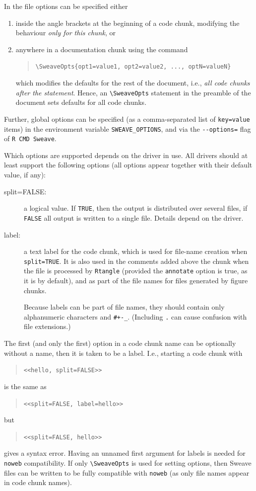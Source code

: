 \documentclass[a4paper]{article}
\begin{document}
In the  file options can be specified either
\begin{enumerate}
 \item inside the angle brackets at the beginning of a code chunk,
  modifying the behaviour \emph{only for this chunk}, or
 \item anywhere in a documentation chunk using the command %
  \begin{quote}
    \verb|\SweaveOpts{opt1=value1, opt2=value2, ..., optN=valueN}|
  \end{quote}
  which modifies the defaults for the rest of the document, i.e.,
  \emph{all code chunks after the statement}. Hence, an
  \verb|\SweaveOpts| statement in the preamble of the document sets
  defaults for all code chunks.
\end{enumerate}
Further, global options can be specified (as a comma-separated list of
\texttt{key=value} items) in the environment variable
\verb|SWEAVE_OPTIONS|, and via the \verb|--options=| flag of
\verb|R CMD Sweave|.

Which options are supported depends on the driver in use. All drivers
should at least support the following options (all options appear
together with their default value, if any):
\begin{description}
  \item[split=FALSE:] a logical value. If \texttt{TRUE}, then the output is
   distributed over several files, if \texttt{FALSE} all output is
   written to a single file.  Details depend on the driver.

 \item[label:] a text label for the code chunk, which is used for
   file-name creation when \texttt{split=TRUE}.  It is also used in
   the comments added above the chunk when the file is processed by
   \texttt{Rtangle} (provided the \texttt{annotate} option is true, as
   it is by default), and as part of the file names for files
   generated by figure chunks.

   Because labels can be part of file names, they should contain only
   alphanumeric characters and \texttt{\#+-\_}.  (Including \texttt{.}
   can cause confusion with file extensions.)
\end{description}

The first (and only the first) option in a code chunk name can be
optionally without a name, then it is taken to be a label. I.e.,
starting a code chunk with
\begin{quote}
  \verb|<<hello, split=FALSE>>|
\end{quote}
is the same as
\begin{quote}
  \verb|<<split=FALSE, label=hello>>|
\end{quote}
but
\begin{quote}
  \verb|<<split=FALSE, hello>>|
\end{quote}
gives a syntax error. Having an unnamed first argument for labels is
needed for \texttt{noweb} compatibility. If only \verb|\SweaveOpts| is used for
setting options, then Sweave files can be written to be fully
compatible with \texttt{noweb} (as only file names appear in code chunk
names).
\end{document}
